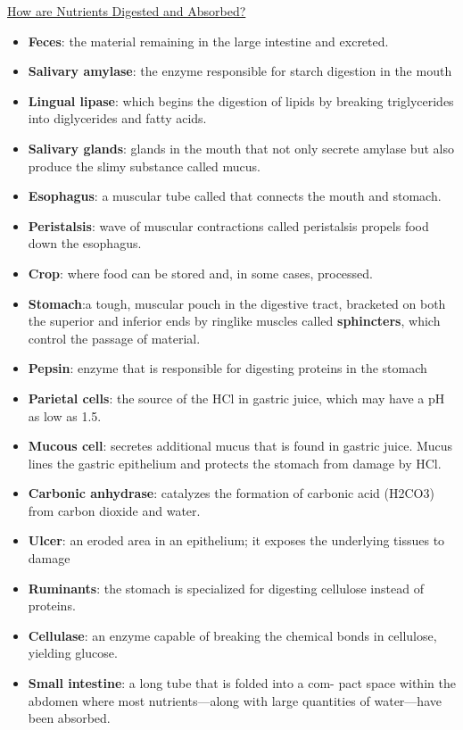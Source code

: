 \documentclass[12pt,letterpaper]{article}
\begin{document}
\begin{secbox}{\hyperlink{41}{How are Nutrients Digested and Absorbed?}}
{\begin{itemize}
\begin{center}
        \end{center}
        \item \textbf{Feces}: the material remaining in the large intestine and excreted.
        \item \textbf{Salivary amylase}: the enzyme  responsible for starch digestion in the mouth
        \item \textbf{Lingual lipase}: which begins the digestion of lipids by breaking triglycerides into diglycerides and fatty acids.
        \item \textbf{Salivary glands}: glands in the mouth that not only secrete amylase but also produce the slimy substance called mucus.
        \item \textbf{Esophagus}: a muscular tube called that connects the mouth and stomach.
        \item \textbf{Peristalsis}: wave of muscular contractions called peristalsis propels food down the esophagus.
        \item \textbf{Crop}: where food can be stored and, in some cases, processed.
        \item \textbf{Stomach}:a tough, muscular pouch in the digestive tract, bracketed on both the superior and inferior ends by ringlike muscles called \textbf{sphincters}, which control the passage of material.
        \item \textbf{Pepsin}: enzyme that is responsible for digesting proteins in the stomach
        \item \textbf{Parietal cells}: the source of the HCl in gastric juice, which may have a pH as low as 1.5.
        \item \textbf{Mucous cell}: secretes additional mucus that is found in gastric juice. Mucus lines the gastric epithelium and protects the stomach from damage by HCl.
        \item \textbf{Carbonic anhydrase}: catalyzes the formation of carbonic acid (H2CO3) from carbon dioxide and water.
        \item \textbf{Ulcer}: an eroded area in an epithelium; it exposes the underlying tissues to damage
        \item \textbf{Ruminants}: the stomach is specialized for digesting cellulose instead of proteins.
        \item \textbf{Cellulase}: an enzyme capable of breaking the chemical bonds in cellulose, yielding glucose.
        \item \textbf{Small intestine}: a long tube that is folded into a com- pact space within the abdomen where most nutrients—along with large quantities of water—have been absorbed.

\end{itemize}}
\end{secbox}
\end{document}
